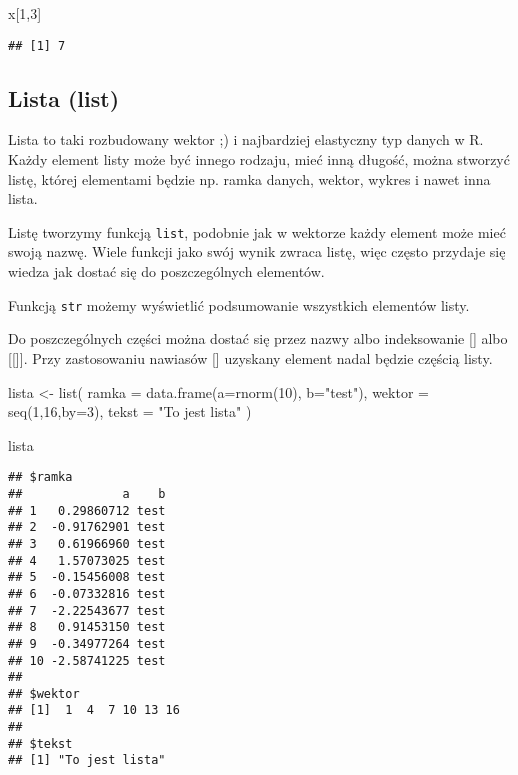 \documentclass[
]{book}
\newenvironment{Shaded}{\begin{snugshade}}{\end{snugshade}}
\newcommand{\AttributeTok}[1]{\textcolor[rgb]{0.77,0.63,0.00}{#1}}
\newcommand{\DecValTok}[1]{\textcolor[rgb]{0.00,0.00,0.81}{#1}}
\newcommand{\FunctionTok}[1]{\textcolor[rgb]{0.00,0.00,0.00}{#1}}
\newcommand{\NormalTok}[1]{#1}
\newcommand{\OtherTok}[1]{\textcolor[rgb]{0.56,0.35,0.01}{#1}}
\newcommand{\StringTok}[1]{\textcolor[rgb]{0.31,0.60,0.02}{#1}}
\begin{document}
\begin{Shaded}
\begin{Highlighting}[]
\NormalTok{x[}\DecValTok{1}\NormalTok{,}\DecValTok{3}\NormalTok{]}
\end{Highlighting}
\end{Shaded}

\begin{verbatim}
## [1] 7
\end{verbatim}

\hypertarget{lista-list}{%
\subsection{Lista (list)}\label{lista-list}}

Lista to taki rozbudowany wektor ;) i najbardziej elastyczny typ danych w R. Każdy element listy może być innego rodzaju, mieć inną długość, można stworzyć listę, której elementami będzie np. ramka danych, wektor, wykres i nawet inna lista.

Listę tworzymy funkcją \texttt{list}, podobnie jak w wektorze każdy element może mieć swoją nazwę. Wiele funkcji jako swój wynik zwraca listę, więc często przydaje się wiedza jak dostać się do poszczególnych elementów.

Funkcją \texttt{str} możemy wyświetlić podsumowanie wszystkich elementów listy.

Do poszczególnych części można dostać się przez nazwy albo indeksowanie {[}{]} albo {[}{[}{]}{]}. Przy zastosowaniu nawiasów {[}{]} uzyskany element nadal będzie częścią listy.

\begin{Shaded}
\begin{Highlighting}[]
\NormalTok{lista }\OtherTok{\textless{}{-}} \FunctionTok{list}\NormalTok{( }\AttributeTok{ramka =} \FunctionTok{data.frame}\NormalTok{(}\AttributeTok{a=}\FunctionTok{rnorm}\NormalTok{(}\DecValTok{10}\NormalTok{), }\AttributeTok{b=}\StringTok{"test"}\NormalTok{), }
               \AttributeTok{wektor =} \FunctionTok{seq}\NormalTok{(}\DecValTok{1}\NormalTok{,}\DecValTok{16}\NormalTok{,}\AttributeTok{by=}\DecValTok{3}\NormalTok{), }
               \AttributeTok{tekst =} \StringTok{"To jest lista"}\NormalTok{ )}

\NormalTok{lista}
\end{Highlighting}
\end{Shaded}

\begin{verbatim}
## $ramka
##              a    b
## 1   0.29860712 test
## 2  -0.91762901 test
## 3   0.61966960 test
## 4   1.57073025 test
## 5  -0.15456008 test
## 6  -0.07332816 test
## 7  -2.22543677 test
## 8   0.91453150 test
## 9  -0.34977264 test
## 10 -2.58741225 test
## 
## $wektor
## [1]  1  4  7 10 13 16
## 
## $tekst
## [1] "To jest lista"
\end{verbatim}
\end{document}
